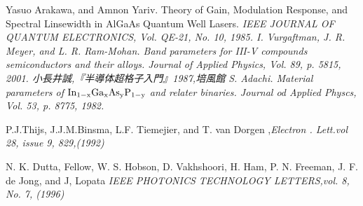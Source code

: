 \begin{thebibliography}{99}
 Yasuo Arakawa, and Amnon Yariv. Theory of Gain, Modulation Response, and Spectral Linsewidth in AlGaAs Quantum Well Lasers. \sl IEEE JOURNAL OF QUANTUM ELECTRONICS\rm , Vol. QE-21, No. 10, 1985.
 I. Vurgaftman, J. R. Meyer, and L. R. Ram-Mohan. Band parameters for III-V compounds semiconductors and their alloys. \sl Journal of Applied Physics\rm , Vol. 89, p. 5815, 2001.
小長井誠,『半導体超格子入門』1987,培風館
 S. Adachi. Material parameters of $\rm{In_{1-x}Ga_{x}As_{y}P_{1-y}}$ and relater binaries. \sl Journal od Applied Physcs\rm , Vol. 53, p. 8775, 1982.

 P.J.Thijs, J.J.M.Binsma, L.F. Tiemejier, and T. van Dorgen ,\sl Electron . Lett.\rm vol 28, issue 9, 829,(1992)

N. K. Dutta, Fellow, W. S. Hobson, D. Vakhshoori, H. Ham, P. N. Freeman, J. F. de Jong, and J, Lopata \sl IEEE PHOTONICS TECHNOLOGY LETTERS\rm ,vol. 8, No. 7, (1996)











\end{thebibliography}
